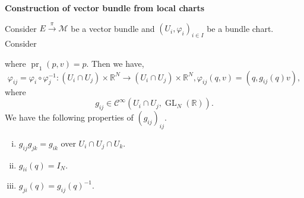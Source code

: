 \documentclass[8pt]{article}
\DeclareMathOperator{\pr}{pr}
\DeclareMathOperator{\GL}{GL}
\newcommand{\R}[0]{\mathbb{R}}
\newcommand{\M}[0]{\mathcal{M}}
\newcommand{\cinf}[0]{\mathcal{C}^\infty}
\begin{document}
\textbf{Construction of vector bundle from local charts}
  \par Consider $E\stackrel{\pi}{\to}\M$ be a vector bundle and $(U_i,\varphi_i)_{i\in I}$ be a bundle chart. Consider 
  \begin{center}
  \end{center}
  where $\pr_1(p,v) = p$. Then we have,
  \begin{equation*}
    \varphi_{ij} = \varphi_i\circ\varphi_j^{-1}:(U_i\cap U_j)\times\R^N\to(U_i\cap U_j)\times\R^N, \varphi_{ij}(q,v) = (q,g_{ij}(q)v),
  \end{equation*}
  where 
  \begin{equation*}
    g_{ij}\in\cinf(U_i\cap U_j,\GL_N(\R)).
  \end{equation*}
  We have the following properties of $(g_{ij})_{ij}$.
  \begin{enumerate}[i).]
    \item $g_{ij}g_{jk} = g_{ik}$ over $U_i\cap U_j\cap U_k$.
    \item $g_{ii}(q) = I_N$.
    \item $g_{ji}(q) = g_{ij}(q)^{-1}$.
  \end{enumerate}
\end{document}

